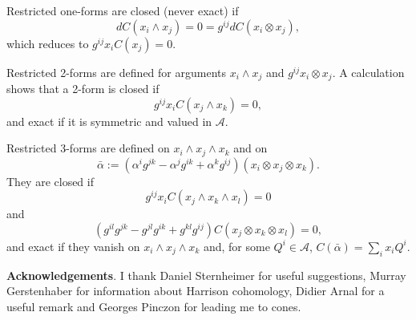 \documentclass[a4paper,a4paper]{article}
\begin{document}
Restricted one-forms are closed (never exact) if
$$
dC(x_i\wedge x_j) = 0 = g^{ij}dC(x_i\otimes x_j),
$$
which reduces to $g^{ij}x_iC(x_j) = 0$.
\medskip

Restricted 2-forms are defined for arguments $x_i\wedge x_j$ and
$g^{ij} x_i\otimes x_j$. A calculation shows that a 2-form is closed if
$$
g^{ij}x_iC(x_j\wedge x_k) = 0,
$$
and exact if it is symmetric and valued in ${\mathcal{A}}$.
\medskip

Restricted 3-forms are defined on $x_i\wedge x_j\wedge x_k$ and on
$$
\bar \alpha := (\alpha^ig^{jk} - \alpha^jg^{ik} +
\alpha^kg^{ij})(x_i\otimes x_j \otimes x_k).
$$
They are closed if
$$
g^{ij}x_i C(x_j\wedge  x_k\wedge  x_l) = 0
$$
and 
$$
(g^{il}g^{jk} -g^{jl}g^{ik} +g^{kl}g^{ij})C(x_j\otimes x_k \otimes x_l) = 0,
$$
and exact if  they vanish on $x_i\wedge x_j \wedge x_k$ and, for some
$Q^i \in  {\mathcal{A}}$, $C(\bar \alpha) = \sum_i x_i Q^i.$
\medskip

\noindent\textbf{Acknowledgements}. 
I thank Daniel Sternheimer for useful suggestions,  Murray
Gerstenhaber for information about Harrison cohomology, Didier Arnal for
a useful remark and Georges Pinczon for leading me to cones.
\end{document}
